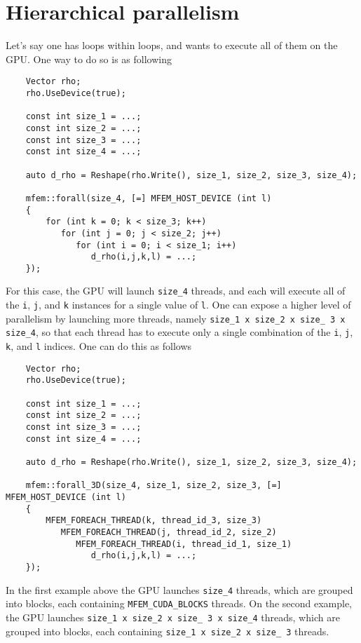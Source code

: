 \documentclass[a4paper,11pt]{article}
\begin{document}
\section{Hierarchical parallelism}
Let's say one has loops within loops, and wants to execute all of them on the GPU. One way to do so is as following
\begin{lstlisting}
    Vector rho;
    rho.UseDevice(true);

    const int size_1 = ...;
    const int size_2 = ...;
    const int size_3 = ...;
    const int size_4 = ...;

    auto d_rho = Reshape(rho.Write(), size_1, size_2, size_3, size_4);

    mfem::forall(size_4, [=] MFEM_HOST_DEVICE (int l) 
    {
        for (int k = 0; k < size_3; k++)
           for (int j = 0; j < size_2; j++)
              for (int i = 0; i < size_1; i++)
                 d_rho(i,j,k,l) = ...;
    });
\end{lstlisting}
For this case, the GPU will launch \texttt{size\_4} threads, and each will execute all of the \texttt{i}, \texttt{j}, and \texttt{k} instances for a single value of \texttt{l}. One can expose a higher level of parallelism by launching more threads, namely \texttt{size\_1 x size\_2 x size\_ 3 x size\_4}, so that each thread has to execute only a single combination of the \texttt{i}, \texttt{j}, \texttt{k}, and \texttt{l} indices. One can do this as follows
\begin{lstlisting}
    Vector rho;
    rho.UseDevice(true);

    const int size_1 = ...;
    const int size_2 = ...;
    const int size_3 = ...;
    const int size_4 = ...;

    auto d_rho = Reshape(rho.Write(), size_1, size_2, size_3, size_4);

    mfem::forall_3D(size_4, size_1, size_2, size_3, [=] MFEM_HOST_DEVICE (int l) 
    {
        MFEM_FOREACH_THREAD(k, thread_id_3, size_3)
           MFEM_FOREACH_THREAD(j, thread_id_2, size_2)
              MFEM_FOREACH_THREAD(i, thread_id_1, size_1)
                 d_rho(i,j,k,l) = ...;
    });
\end{lstlisting}
In the first example above the GPU launches \texttt{size\_4} threads, which are grouped into blocks, each containing \texttt{MFEM\_CUDA\_BLOCKS} threads. On the second example, the GPU launches \texttt{size\_1 x size\_2 x size\_ 3 x size\_4} threads, which are grouped into blocks, each containing \texttt{size\_1 x size\_2 x size\_ 3} threads. 
\end{document}
